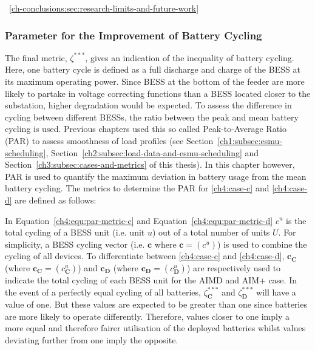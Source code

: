 ~\ref{ch-conclusions:sec:research-limits-and-future-work}

\subsubsection{Parameter for the Improvement of Battery Cycling}

The final metric, $\zeta^{***}$, gives an indication of the inequality of battery cycling.
Here, one battery cycle is defined as a full discharge and charge of the BESS at its maximum operating power.
Since BESS at the bottom of the feeder are more likely to partake in voltage correcting functions than a BESS located closer to the substation, higher degradation would be expected.
To assess the difference in cycling between different BESSs, the ratio between the peak and mean battery cycling is used.
Previous chapters used this so called Peak-to-Average Ratio (PAR) to assess smoothness of load profiles (see Section~\ref{ch1:subsec:esmu-scheduling}, Section~\ref{ch2:subsec:load-data-and-esmu-scheduling} and Section~\ref{ch3:subsec:cases-and-metrics} of this thesis).
In this chapter however, PAR is used to quantify the maximum deviation in battery usage from the mean battery cycling.
The metrics to determine the PAR for \ref{ch4:case-c} and \ref{ch4:case-d} are defined as follows:




In Equation~\ref{ch4:equ:par-metric-c} and Equation~\ref{ch4:equ:par-metric-d} $c^u$ is the total cycling of a BESS unit (i.e. unit $u$) out of a total number of units $U$.
For simplicity, a BESS cycling vector (i.e. $\textbf{c}$ where $\textbf{c} = (c^u)$) is used to combine the cycling of all devices.
To differentiate between \ref{ch4:case-c} and \ref{ch4:case-d}, $\textbf{c}_\textbf{C}$ (where $\textbf{c}_\textbf{C} = (c^u_\textbf{C})$) and $\textbf{c}_\textbf{D}$ (where $\textbf{c}_\textbf{D} = (c^u_\textbf{D})$) are respectively used to indicate the total cycling of each BESS unit for the AIMD and AIM+ case.
In the event of a perfectly equal cycling of all batteries, $\zeta^{***}_\textbf{C}$ and $\zeta^{***}_\textbf{D}$ will have a value of one.
But these values are expected to be greater than one since batteries are more likely to operate differently.
Therefore, values closer to one imply a more equal and therefore fairer utilisation of the deployed batteries whilst values deviating further from one imply the opposite.
